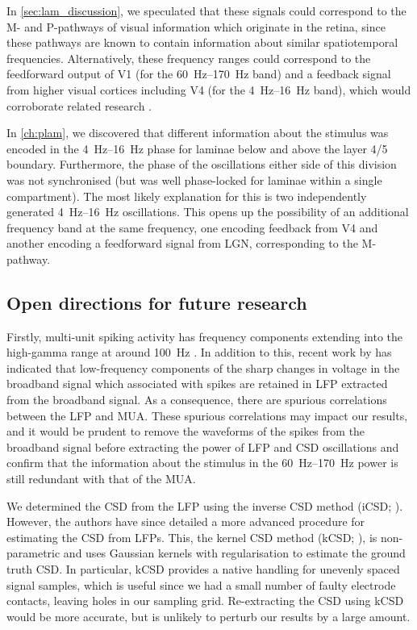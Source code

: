 In \autoref{sec:lam_discussion}, we speculated that these signals could correspond to the M- and P-pathways of visual information which originate in the retina, since these pathways are known to contain information about similar spatiotemporal frequencies.
Alternatively, these frequency ranges could correspond to the feedforward output of \ac{V1} (for the \SIrange{60}{170}{Hz} band) and a feedback signal from higher visual cortices including \ac{V4} (for the \SIrange{4}{16}{Hz} band), which would corroborate related research \citep{VanKerkoerle2014}.

In \autoref{ch:plam}, we discovered that different information about the stimulus was encoded in the \SIrange{4}{16}{Hz} phase for laminae below and above the layer 4/5 boundary.
Furthermore, the phase of the oscillations either side of this division was not synchronised (but was well phase-locked for laminae within a single compartment).
The most likely explanation for this is two independently generated \SIrange{4}{16}{Hz} oscillations.
This opens up the possibility of an additional frequency band at the same frequency, one encoding feedback from \ac{V4} and another encoding a feedforward signal from \ac{LGN}, corresponding to the M-pathway.


\subsection{Open directions for future research}

Firstly, multi-unit spiking activity has frequency components extending into the high-gamma range at around \SI{100}{Hz} \citep{Einevoll2013}.
In addition to this, recent work by \citet{Zanos2011} has indicated that low-frequency components of the sharp changes in voltage in the broadband signal which associated with spikes are retained in \ac{LFP} extracted from the broadband signal.
As a consequence, there are spurious correlations between the \ac{LFP} and \ac{MUA}.
These spurious correlations may impact our results, and it would be prudent to remove the waveforms of the spikes from the broadband signal before extracting the power of \ac{LFP} and \ac{CSD} oscillations \citep{Zanos2011} and confirm that the information about the stimulus in the \SIrange{60}{170}{Hz} power is still redundant with that of the \ac{MUA}.

We determined the \ac{CSD} from the \ac{LFP} using the inverse \ac{CSD} method (iCSD; \citealp{Pettersen2006}).
However, the authors have since detailed a more advanced procedure for estimating the \ac{CSD} from \acp{LFP}.
This, the kernel \acl{CSD} method (kCSD; \citealp{Potworowski2012}), is non-parametric and uses Gaussian kernels with regularisation to estimate the ground truth \ac{CSD}.
In particular, kCSD provides a native handling for unevenly spaced signal samples, which is useful since we had a small number of faulty electrode contacts, leaving holes in our sampling grid.
Re-extracting the \ac{CSD} using kCSD would be more accurate, but is unlikely to perturb our results by a large amount.

